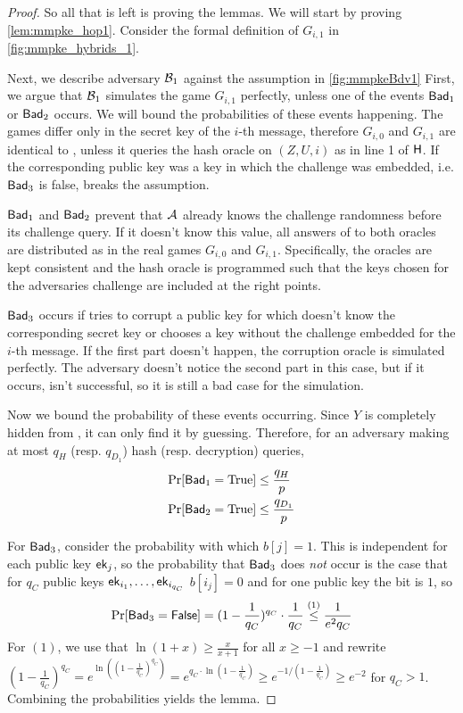 \begin{proof}
  So all that is left is proving the lemmas.
  We will start by proving \cref{lem:mmpke_hop1}. Consider the formal definition of $G_{i,1}$ in \cref{fig:mmpke_hybrids_1}.
  

  Next, we describe adversary $\Bdv[1]$ against the \sdh assumption in \cref{fig:mmpkeBdv1}
  First, we argue that $\Bdv[1]$ simulates the game $G_{i,1}$ perfectly, unless one of the events $\term{Bad}_1$ or
  $\term{Bad}_2$ occurs. We will bound the probabilities of these events happening. The games differ only in the
  secret key of the $i$-th message, therefore $G_{i,0}$ and $G_{i,1}$ are identical to
  \Adv, unless it queries the hash oracle on $(Z, U, i)$ as in line 1 of $\term{H}$. If the
  corresponding public key was a key in which the challenge was embedded, i.e. $\term{Bad}_3$ is false, \Bdv[1] breaks
  the \sdh assumption.

  $\term{Bad}_1$ and $\term{Bad}_2$ prevent that $\Adv$ already knows the challenge randomness before its challenge
  query. If it doesn't know this value, all answers of \Bdv[1] to both oracles are distributed as in the real games $G_{i,0}$
  and $G_{i,1}$. Specifically, the oracles are kept consistent and the hash oracle is programmed such that the keys chosen
  for the adversaries challenge are included at the right points.

  $\term{Bad}_3$ occurs if \Adv tries to corrupt a public key for which \Bdv[1] doesn't know the corresponding secret
  key or \Adv chooses a key without the challenge embedded for the $i$-th message. If the first part doesn't happen, the
  corruption oracle is simulated perfectly. The adversary doesn't notice the second part in this case, but if it occurs,
  \Bdv[1] isn't successful, so it is still a bad case for the simulation.

  Now we bound the probability of these events occurring. Since $Y$ is completely hidden from \Adv, it can only find it by
  guessing. Therefore, for an adversary \Adv making at most $q_H$ (resp. $q_{D_1}$) hash (resp. decryption) queries,
  \begin{align*}
    \Pr[\term{Bad}_1 = \text{True}] &\leq \frac{q_{H}}{p} \\
    \Pr[\term{Bad}_2 = \text{True}] &\leq \frac{q_{D_1}}{p}
  \end{align*}

  For $\term{Bad}_3$, consider the probability with which $b[j] = 1$. This is independent for each public key
  $\mmpkepk_j$, so the probability that $\term{Bad}_3$ does \emph{not} occur is the case that for $q_C$ public keys
  $\mmpkepk_{i_1},\ldots,\mmpkepk_{i_{q_C}}$ $b[i_j] = 0$ and for one public key the bit is $1$, so
  \[
    \Pr[\term{Bad}_3 = \term{False}] = (1-\frac{1}{q_C})^{q_C}\cdot \frac{1}{q_C} \overset{(1)}{\leq} \frac{1}{e^2q_C}
  \]
  For $(1)$, we use that $\ln(1+x) \geq \frac{x}{x+1}$ for all $x \geq -1$ and rewrite $(1-\frac{1}{q_C})^{q_C} =
  e^{\ln((1-\frac{1}{q_C})^{q_C})} = e^{q_C\cdot\ln(1-\frac{1}{q_C})} \geq e^{-1/(1-\frac{1}{q_C})} \geq e^{-2}$ for
  $q_C > 1$.
  Combining the probabilities yields the lemma.


\end{proof}
